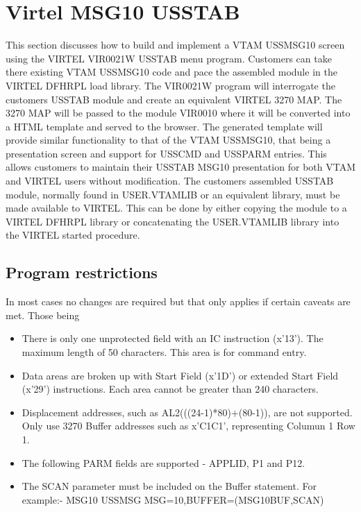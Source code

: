 \documentclass[letterpaper,10pt,english]{sphinxmanual}
\begin{document}
\chapter{Virtel MSG10 USSTAB}
\label{\detokenize{Customization:virtel-msg10-usstab}}\label{\detokenize{Customization:index-127}}
This section discusses how to build and implement a VTAM USSMSG10 screen using the VIRTEL VIR0021W USSTAB menu program. Customers can take there existing VTAM USSMSG10 code and pace the assembled module in the VIRTEL DFHRPL load library. The VIR0021W program will interrogate the customers USSTAB module and create an equivalent VIRTEL 3270 MAP. The 3270 MAP will be passed to the module VIR0010 where it will be converted into a HTML template and served to the browser. The generated template will provide similar functionality to that of the VTAM USSMSG10, that being a presentation screen and support for USSCMD and USSPARM entries. This allows customers to maintain their USSTAB MSG10 presentation for both VTAM and VIRTEL users without modification. The customers assembled USSTAB module, normally found in USER.VTAMLIB or an equivalent library, must be made available to VIRTEL. This can be done by either copying the module to a VIRTEL DFHRPL library or concatenating the USER.VTAMLIB library into the VIRTEL started procedure.


\section{Program restrictions}
\label{\detokenize{Customization:program-restrictions}}
In most cases no changes are required but that only applies if certain caveats are met. Those being
\begin{itemize}
\item {} 
There is only one unprotected field with an IC instruction (x’13’). The maximum length of 50 characters. This area is for command entry.

\item {} 
Data areas are broken up with Start Field (x’1D’) or extended Start Field (x’29’) instructions. Each area cannot be greater than 240 characters.

\item {} 
Displacement addresses, such as AL2(((24-1)*80)+(80-1)), are not supported. Only use 3270 Buffer addresses such as x’C1C1’, representing Columun 1 Row 1.

\item {} 
The following PARM fields are supported - APPLID, P1 and P12.

\item {} 
The SCAN parameter must be included on the Buffer statement. For example:- MSG10 USSMSG MSG=10,BUFFER=(MSG10BUF,SCAN)

\end{itemize}
\end{document}
